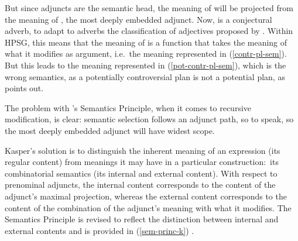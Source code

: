 \documentclass[output=paper,biblatex,babelshorthands,newtxmath,draftmode,colorlinks,citecolor=brown]{langscibook}
\begin{document}
\begin{exe}
\ex\label{contr-pl-sem}

\end{exe}

\noindent
But since adjuncts are the semantic head, the meaning of  will be projected from the meaning of , the most deeply embedded adjunct. Now,  is  a conjectural adverb, to adapt to adverbs the classification of adjectives proposed by \citet[125]{KeenanandFaltz1985}. Within HPSG, this means that the meaning of  is a function that takes the meaning of what it modifies as argument, i.e.\ the meaning represented in (\ref{contr-pl-sem}). But this leads to the meaning represented in (\ref{pot-contr-pl-sem}), which is the wrong semantics, as a potentially controversial plan is not a potential plan, as \citet[10--11]{Kasper1997} points out.

\begin{exe}
\ex\label{pot-contr-pl-sem}
\end{exe}

\noindent
The problem with \citeauthor{PollardandSag1994}'s Semantics Principle,
when it comes to recursive modification, is clear: semantic selection follows an adjunct path, so to
speak, so the most deeply embedded adjunct will have widest scope.  

\largerpage[2]
Kasper's solution is to distinguish the inherent meaning of an expression (its regular content) from
meanings it may have in a particular construction:\ its combinatorial semantics (its internal and
external content). With respect to prenominal adjuncts, the internal content corresponds to the
content of the adjunct's maximal projection, whereas the external content corresponds to the content
of the combination of the adjunct's meaning with what it modifies. The Semantics Principle is
revised to reflect the distinction between internal and external contents and is provided in
(\ref{sem-princ-k}) \citep[19]{Kasper1997}. 
\end{document}
